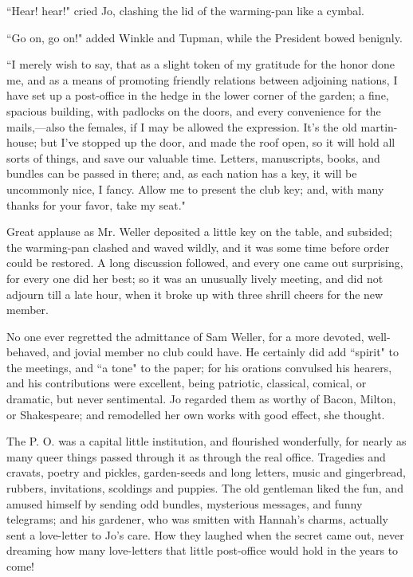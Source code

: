 ``Hear! hear!" cried Jo, clashing the lid of the warming-pan like a
cymbal.

``Go on, go on!" added Winkle and Tupman, while the President bowed
benignly.

``I merely wish to say, that as a slight token of my gratitude for the
honor done me, and as a means of promoting friendly relations between
adjoining nations, I have set up a post-office in the hedge in the lower
corner of the garden; a fine, spacious building, with padlocks on the
doors, and every convenience for the mails,---also the females, if I may
be allowed the expression. It's the old martin-house;
but I've stopped up the door, and made the roof open, so
it will hold all sorts of things, and save our valuable time. Letters,
manuscripts, books, and bundles can be passed in there; and, as each
nation has a key, it will be uncommonly nice, I fancy. Allow me to
present the club key; and, with many thanks for your favor, take my
seat."

Great applause as Mr. Weller deposited a little key on the table, and
subsided; the warming-pan clashed and waved wildly, and it was some time
before order could be restored. A long discussion followed, and every
one came out surprising, for every one did her best; so it was an
unusually lively meeting, and did not adjourn till a late hour, when it
broke up with three shrill cheers for the new member.

No one ever regretted the admittance of Sam Weller, for a more devoted,
well-behaved, and jovial member no club could have. He certainly did add
``spirit" to the meetings, and ``a tone" to the paper; for his orations
convulsed his hearers, and his contributions were excellent, being
patriotic, classical, comical, or dramatic, but never sentimental. Jo
regarded them as worthy of Bacon, Milton, or Shakespeare; and remodelled
her own works with good effect, she thought.

The P. O. was a capital little institution, and flourished wonderfully,
for nearly as many queer things passed through it as through the real
office. Tragedies and cravats, poetry and pickles, garden-seeds and long
letters, music and gingerbread, rubbers, invitations, scoldings and
puppies. The old gentleman liked the fun, and amused himself by sending
odd bundles, mysterious messages, and funny telegrams; and his gardener,
who was smitten with Hannah's charms, actually sent a
love-letter to Jo's care. How they laughed when the
secret came out, never dreaming how many love-letters that little
post-office would hold in the years to come!
